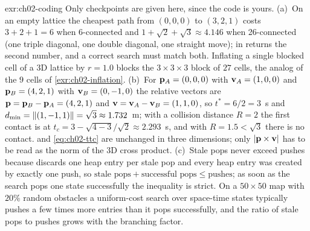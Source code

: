 \begin{solution}{exr:ch02-coding}
Only checkpoints are given here, since the code is yours. (a)~On an empty lattice the cheapest path from $(0,0,0)$ to $(3,2,1)$ costs $3+2+1=6$ when 6-connected and $1+\sqrt2+\sqrt3\approx4.146$ when 26-connected (one triple diagonal, one double diagonal, one straight move);  in  returns the second number, and a correct search must match both. Inflating a single blocked cell of a 3D lattice by $r=1.0$ blocks the $3\times3\times3$ block of $27$ cells, the analog of the $9$ cells of \cref{exr:ch02-inflation}. (b)~For $\mathbf{p}_A=(0,0,0)$ with $\mathbf{v}_A=(1,0,0)$ and $\mathbf{p}_B=(4,2,1)$ with $\mathbf{v}_B=(0,-1,0)$ the relative vectors are $\mathbf{p}=\mathbf{p}_B-\mathbf{p}_A=(4,2,1)$ and $\mathbf{v}=\mathbf{v}_A-\mathbf{v}_B=(1,1,0)$, so $t^*=6/2=3$~s and $d_{\min}=\left\lVert (1,-1,1) \right\rVert=\sqrt3\approx1.732$~m; with a collision distance $R=2$ the first contact is at $t_c=3-\sqrt{4-3}/\sqrt2\approx2.293$~s, and with $R=1.5<\sqrt3$ there is no contact.  and \cref{eq:ch02-ttc} are unchanged in three dimensions; only $\left\lvert \mathbf{p}\times\mathbf{v} \right\rvert$ has to be read as the norm of the 3D cross product. (c)~Stale pops never exceed pushes because  discards one heap entry per stale pop and every heap entry was created by exactly one push, so $\text{stale pops}+\text{successful pops}\le\text{pushes}$; as soon as the search pops one state successfully the inequality is strict. On a $50\times50$ map with $20\%$ random obstacles a uniform-cost search over space-time states typically pushes a few times more entries than it pops successfully, and the ratio of stale pops to pushes grows with the branching factor.
\end{solution}
